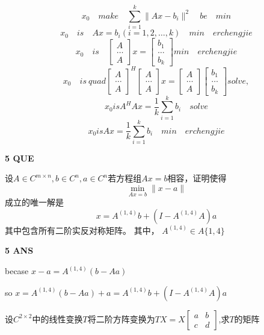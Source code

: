 \documentclass[11pt,letterpaper]{ctexart}
\begin{document}
\begin{enumerate}
\[ x_0 \quad make \quad \displaystyle{\sum_{i = 1}^{k} \parallel Ax - b_i \parallel^2} \quad be \quad min \]
\[ x_0\quad is \quad Ax = b_i(i = 1, 2, \ldots, k) \quad min \quad erchengjie\]
\[ x_0 \quad is \quad \begin{bmatrix}
	A \\
	\ldots \\
	A
\end{bmatrix}x = \begin{bmatrix}
	b_1 \\
	\ldots \\
	b_k
\end{bmatrix} min \quad erchengjie\]
\[ x_0 \quad is \ quad \begin{bmatrix}
	A \\
	\ldots \\
	A
\end{bmatrix}^H \begin{bmatrix}
	A \\
	\ldots \\
	A
\end{bmatrix}x = \begin{bmatrix}
	A \\
	\ldots \\
	A
\end{bmatrix}\begin{bmatrix}
	b_1 \\
	\ldots \\
	b_k
\end{bmatrix} solve,\]
\[ x_0 is A^HAx = \frac{1}{k}\displaystyle{\sum_{i = 1}^{k}b_i} \quad solve\]
\[ x_0 is Ax = \frac{1}{k}\displaystyle{\sum_{i = 1}^{k}b_i}\quad min \quad erchengjie\]

\textbf{5 QUE}
\bigskip

设$A \in C_{}^{m \times n}, b \in C_{}^{n}, a \in C_{}^{n}$若方程组$Ax = b$相容，证明使得
\[ \min\limits_{Ax = b}\parallel x - a \parallel\]成立的唯一解是
\[x = A^{(1,4)}b + (I - A^{(1,4)}A)a\]其中包含所有二阶实反对称矩阵。
其中， $A^{(1,4)} \in A\{1,4\}$

\textbf{5 ANS}
\bigskip

becase $x - a = A^{(1,4)}(b - Aa)$

so $x = A^{(1, 4)}(b - Aa) + a = A^{(1, 4)}b + (I - A^{(1,4)}A)a$

\end{enumerate}

\bigskip\bigskip
\bigskip\bigskip



设$C_{}^{2 \times 2}$中的线性变换$T$将二阶方阵变换为$TX = X \begin{bmatrix}
	a & b \\
	c & d
\end{bmatrix}$,求$T$的矩阵
\end{document}
